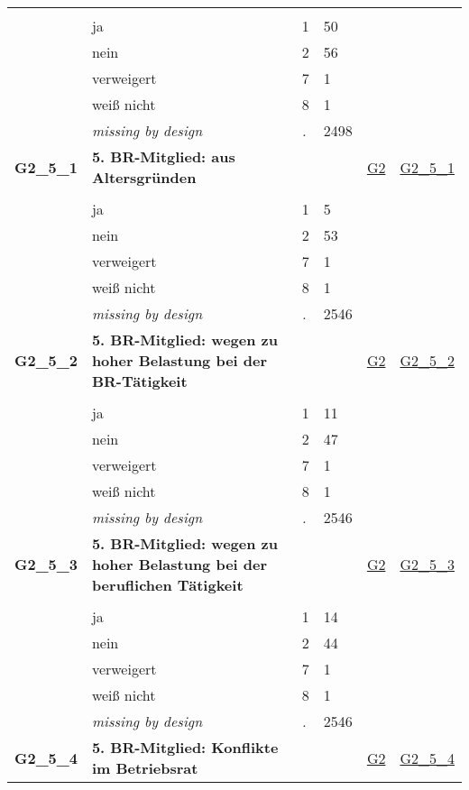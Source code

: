 \begin{longtable}{| L{2.45cm} | L{6cm} | C{1.5cm} | R{1cm} | C{2.25cm} | C{2.25cm} |}
   &  &  &  &  &  \\ 
   & ja & 1 & 50 &  &  \\ 
   & nein & 2 & 56 &  &  \\ 
   & verweigert & 7 & 1 &  &  \\ 
   & weiß nicht & 8 & 1 &  &  \\ 
   & \textit{missing by design} & \textit{.} & 2498 &  &  \\ 
   \midrule
\textbf{G2\_5\_1}\label{var:G2:5:1} & \textbf{5. BR-Mitglied: aus Altersgründen} &  &  & \hyperref[G2]{G2} & \hyperref[var:suf:G2:5:1]{G2\_5\_1} \\ 
   &  &  &  &  &  \\ 
   & ja & 1 & 5 &  &  \\ 
   & nein & 2 & 53 &  &  \\ 
   & verweigert & 7 & 1 &  &  \\ 
   & weiß nicht & 8 & 1 &  &  \\ 
   & \textit{missing by design} & \textit{.} & 2546 &  &  \\ 
   \midrule
\textbf{G2\_5\_2}\label{var:G2:5:2} & \textbf{5. BR-Mitglied: wegen zu hoher Belastung bei der BR-Tätigkeit} &  &  & \hyperref[G2]{G2} & \hyperref[var:suf:G2:5:2]{G2\_5\_2} \\ 
   &  &  &  &  &  \\ 
   & ja & 1 & 11 &  &  \\ 
   & nein & 2 & 47 &  &  \\ 
   & verweigert & 7 & 1 &  &  \\ 
   & weiß nicht & 8 & 1 &  &  \\ 
   & \textit{missing by design} & \textit{.} & 2546 &  &  \\ 
   \midrule
\textbf{G2\_5\_3}\label{var:G2:5:3} & \textbf{5. BR-Mitglied: wegen zu hoher Belastung bei der beruflichen Tätigkeit} &  &  & \hyperref[G2]{G2} & \hyperref[var:suf:G2:5:3]{G2\_5\_3} \\ 
   &  &  &  &  &  \\ 
   & ja & 1 & 14 &  &  \\ 
   & nein & 2 & 44 &  &  \\ 
   & verweigert & 7 & 1 &  &  \\ 
   & weiß nicht & 8 & 1 &  &  \\ 
   & \textit{missing by design} & \textit{.} & 2546 &  &  \\ 
   \midrule
\textbf{G2\_5\_4}\label{var:G2:5:4} & \textbf{5. BR-Mitglied: Konflikte im Betriebsrat} &  &  & \hyperref[G2]{G2} & \hyperref[var:suf:G2:5:4]{G2\_5\_4} \\ 

\end{longtable}
